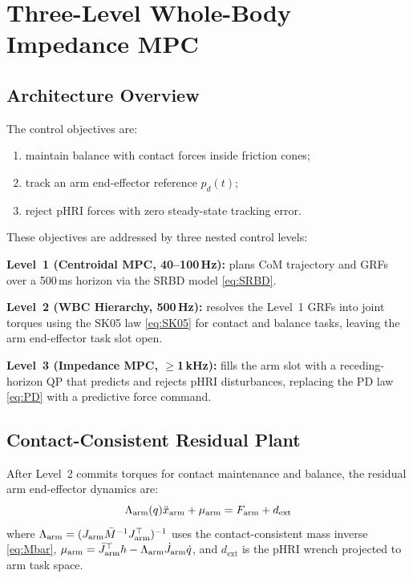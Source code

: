 \section{Three-Level Whole-Body Impedance MPC}\label{sec:impedancempc}

\subsection{Architecture Overview}

The control objectives are:
\begin{enumerate}
  \item maintain balance with contact forces inside friction cones;
  \item track an arm end-effector reference $p_d(t)$;
  \item reject pHRI forces with zero steady-state tracking error.
\end{enumerate}

These objectives are addressed by three nested control levels:

\textbf{Level~1 (Centroidal MPC, 40--100\,Hz):} plans CoM trajectory and
GRFs over a 500\,ms horizon via the SRBD model \eqref{eq:SRBD}.

\textbf{Level~2 (WBC Hierarchy, 500\,Hz):} resolves the Level~1 GRFs into
joint torques using the SK05 law \eqref{eq:SK05} for contact and balance
tasks, leaving the arm end-effector task slot open.

\textbf{Level~3 (Impedance MPC, $\geq$1\,kHz):} fills the arm slot with a
receding-horizon QP that predicts and rejects pHRI disturbances, replacing
the PD law \eqref{eq:PD} with a predictive force command.

\subsection{Contact-Consistent Residual Plant}

After Level~2 commits torques for contact maintenance and balance, the
residual arm end-effector dynamics are:
\begin{equation}\label{eq:plant}
  \Lambda_{\text{arm}}(q)\ddot{x}_{\text{arm}}+\mu_{\text{arm}} = F_{\text{arm}}+d_{\text{ext}}
\end{equation}
where $\Lambda_{\text{arm}}=(J_{\text{arm}}\bar{M}^{-1} J_{\text{arm}}^\top)^{-1}$ uses the
contact-consistent mass inverse \eqref{eq:Mbar},
$\mu_{\text{arm}}=\bar{J}_{\text{arm}}^\top h - \Lambda_{\text{arm}}\dot{J}_{\text{arm}}\dot{q}$,
and $d_{\text{ext}}$ is the pHRI wrench projected to arm task space.

